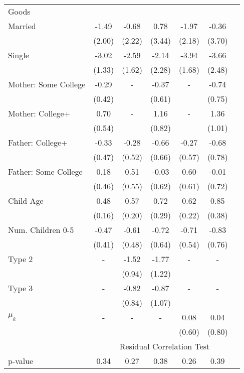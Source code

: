\begin{tabular}{lcccccc}
Goods}\\\cmidrule(r){2-7}Married&-1.49&-0.68&0.78&-1.97&-0.36&\\&(2.00)&(2.22)&(3.44)&(2.18)&(3.70)&\\Single&-3.02&-2.59&-2.14&-3.94&-3.66&\\&(1.33)&(1.62)&(2.28)&(1.68)&(2.48)&\\Mother: Some College&-0.29&-&-0.37&-&-0.74&\\&(0.42)&&(0.61)&&(0.75)&\\Mother: College+&0.70&-&1.16&-&1.36&\\&(0.54)&&(0.82)&&(1.01)&\\Father: College+&-0.33&-0.28&-0.66&-0.27&-0.68&\\&(0.47)&(0.52)&(0.66)&(0.57)&(0.78)&\\Father: Some College&0.18&0.51&-0.03&0.60&-0.01&\\&(0.46)&(0.55)&(0.62)&(0.61)&(0.72)&\\Child Age&0.48&0.57&0.72&0.62&0.85&\\&(0.16)&(0.20)&(0.29)&(0.22)&(0.38)&\\Num. Children 0-5&-0.47&-0.61&-0.72&-0.71&-0.83&\\&(0.41)&(0.48)&(0.64)&(0.54)&(0.76)&\\Type 2&-&-1.52&-1.77&-&-&\\&&(0.94)&(1.22)&&&\\Type 3&-&-0.82&-0.87&-&-&\\&&(0.84)&(1.07)&&&\\$\mu_{k}$&-&-&-&0.08&0.04&\\&&&&(0.60)&(0.80)&\\& \multicolumn{6}{c}{Residual Correlation Test}\\\cmidrule(r){2-7}p-value&0.34&0.27&0.38&0.26&0.39&\\
\bottomrule\end{tabular}
